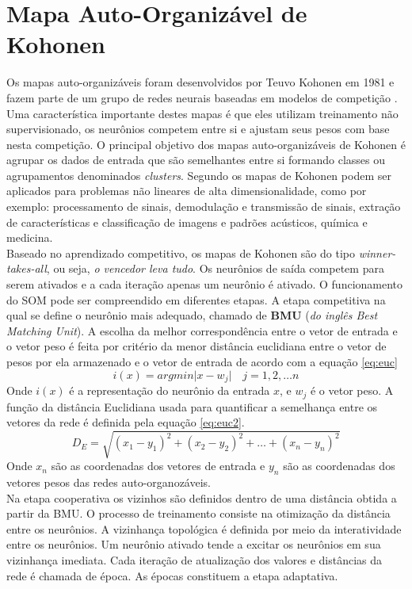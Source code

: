 \section{Mapa Auto-Organizável de Kohonen}
\label{sec:kohonen}
Os mapas auto-organizáveis foram desenvolvidos por Teuvo Kohonen em 1981 e fazem parte de um grupo de redes neurais baseadas em modelos de competição \cite{fia}. Uma característica importante destes mapas é que eles utilizam treinamento não supervisionado, os neurônios competem entre si e ajustam  seus pesos com base nesta competição. O principal objetivo dos mapas auto-organizáveis de Kohonen é agrupar os dados de entrada que são semelhantes entre si formando classes ou agrupamentos denominados \textit{clusters}. Segundo \cite{agua} os mapas de Kohonen podem ser aplicados para problemas não lineares de alta dimensionalidade, como por exemplo: processamento de sinais, demodulação e transmissão de sinais, extração de características e classificação de imagens e padrões acústicos, química e medicina. \\
Baseado no aprendizado competitivo, os mapas de Kohonen são do tipo \textit{winner-takes-all}, ou seja, \textit{o vencedor leva tudo}. Os neurônios de saída competem para serem ativados e a cada iteração apenas um neurônio é ativado. O funcionamento do SOM pode ser compreendido em diferentes etapas. A etapa competitiva na qual se define o neurônio mais adequado, chamado de \textbf{BMU} (\textit{do inglês Best Matching Unit}). A escolha da melhor correspondência entre o vetor de entrada e o vetor peso é feita por critério da menor distância euclidiana entre o vetor de pesos por ela armazenado e o vetor de entrada de acordo com a equação \ref{eq:euc} 
\begin{equation}
\label{eq:euc}
i(x)= argmin \big|x - w_j \big| \quad j = 1,2, \ldots n
\end{equation}
Onde $i(x)$ é a representação do neurônio da entrada $x$, e $w_j$ é o vetor peso. A função da  distância Euclidiana usada para 
quantificar a semelhança entre os vetores da rede é definida pela equação \ref{eq:euc2}.
\begin{equation}
\label{eq:euc2}
D_E = \sqrt{(x_1 - y_1)^2 + (x_2 - y_2)^2 + \ldots + (x_n - y_n)^2}
\end{equation}
Onde $x_n$ são as coordenadas dos vetores de entrada e $y_n$ são as coordenadas dos vetores  pesos  das redes auto-organozáveis.\\
Na etapa cooperativa os vizinhos são definidos dentro de uma distância obtida a partir da BMU. O processo de treinamento consiste na otimização da distância entre os neurônios. A vizinhança topológica é definida por meio da interatividade entre os neurônios. Um neurônio ativado tende a excitar os neurônios em sua vizinhança imediata. Cada iteração de atualização dos valores e distâncias da rede é chamada de época. As épocas constituem a  etapa adaptativa.



